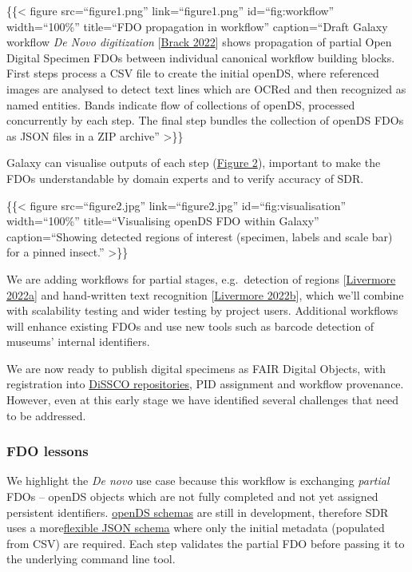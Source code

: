 \{\{\textless{} figure src=``figure1.png'' link=``figure1.png''
id=``fig:workflow'' width=``100\%'' title=``FDO propagation in
workflow'' caption=``Draft Galaxy workflow \emph{De Novo digitization}
{[}\href{https://doi.org/10.48546/workflowhub.workflow.373.1}{Brack
2022}{]} shows propagation of partial Open Digital Specimen FDOs between
individual canonical workflow building blocks. First steps process a CSV
file to create the initial openDS, where referenced images are analysed
to detect text lines which are OCRed and then recognized as named
entities. Bands indicate flow of collections of openDS, processed
concurrently by each step. The final step bundles the collection of
openDS FDOs as JSON files in a ZIP archive'' \textgreater\}\}

Galaxy can visualise outputs of each step
(\protect\hyperlink{fig:visualisaton}{Figure 2}), important to make the
FDOs understandable by domain experts and to verify accuracy of SDR.

\{\{\textless{} figure src=``figure2.jpg'' link=``figure2.jpg''
id=``fig:visualisation'' width=``100\%'' title=``Visualising openDS FDO
within Galaxy'' caption=``Showing detected regions of interest
(specimen, labels and scale bar) for a pinned insect.'' \textgreater\}\}

We are adding workflows for partial stages, e.g.~detection of regions
{[}\href{https://doi.org/10.48546/workflowhub.workflow.374.1}{Livermore
2022a}{]} and hand-written text recognition
{[}\href{https://doi.org/10.48546/workflowhub.workflow.375.1}{Livermore
2022b}{]}, which we'll combine with scalability testing and wider
testing by project users. Additional workflows will enhance existing
FDOs and use new tools such as barcode detection of museums' internal
identifiers.

We are now ready to publish digital specimens as FAIR Digital Objects,
with registration into
\href{https://www.dissco.eu/dissco/technical-infrastructure/}{DiSSCO
repositories}, PID assignment and workflow provenance. However, even at
this early stage we have identified several challenges that need to be
addressed.

\hypertarget{fdo-lessons}{%
\subsubsection{FDO lessons}\label{fdo-lessons}}

We highlight the \emph{De novo} use case because this workflow is
exchanging \emph{partial} FDOs -- openDS objects which are not fully
completed and not yet assigned persistent identifiers.
\href{https://github.com/DiSSCo/openDS}{openDS schemas} are still in
development, therefore SDR uses a
more\href{https://github.com/DiSSCo/SDR/blob/main/galaxy-workflow/config/opends-schema.json}{flexible
JSON schema} where only the initial metadata (populated from CSV) are
required. Each step validates the partial FDO before passing it to the
underlying command line tool.

